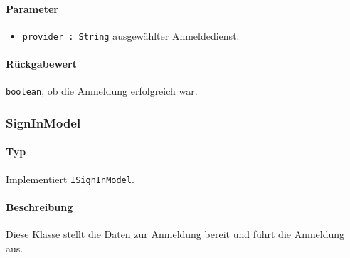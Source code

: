 \paragraph*{Parameter}
\begin{itemize}
    \item \texttt{provider : String} ausgewählter Anmeldedienst.
\end{itemize}
\paragraph*{Rückgabewert}
\texttt{boolean}, ob die Anmeldung erfolgreich war.

\subsubsection{SignInModel}
\paragraph*{Typ}
Implementiert \texttt{ISignInModel}.
\paragraph*{Beschreibung}
Diese Klasse stellt die Daten zur Anmeldung bereit und führt die Anmeldung aus.